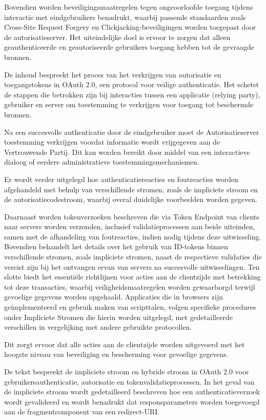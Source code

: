 Bovendien worden beveiligingsmaatregelen tegen ongeoorloofde toegang tijdens interactie met eindgebruikers benadrukt, waarbij passende standaarden zoals Cross-Site Request Forgery en Clickjacking-beveiligingen worden toegepast door de autorisatieserver.
Het uiteindelijke doel is ervoor te zorgen dat alleen geauthenticeerde en geautoriseerde gebruikers toegang hebben tot de gevraagde bronnen.

De inhoud bespreekt het proces van het verkrijgen van autorisatie en toegangstokens in OAuth 2.0, een protocol voor veilige authenticatie. Het schetst de stappen die betrokken zijn bij interacties tussen een applicatie (relying party), gebruiker en server om toestemming te verkrijgen voor toegang tot beschermde bronnen.

Na een succesvolle authenticatie door de eindgebruiker moet de Autorisatieserver toestemming verkrijgen voordat informatie wordt vrijgegeven aan de Vertrouwende Partij. Dit kan worden bereikt door middel van een interactieve dialoog of eerdere administratieve toestemmingsmechanismen.

Er wordt verder uitgelegd hoe authenticatiereacties en foutreacties worden afgehandeld met behulp van verschillende stromen, zoals de impliciete stroom en de autorisatiecodestroom, waarbij overal duidelijke voorbeelden worden gegeven.

Daarnaast worden tokenverzoeken beschreven die via Token Endpoint van clients naar servers worden verzonden, inclusief validatieprocessen aan beide uiteinden, samen met de afhandeling van foutreacties, indien nodig tijdens deze uitwisseling.
Bovendien behandelt het details over het gebruik van ID-tokens binnen verschillende stromen, zoals impliciete stromen, naast de respectieve validaties die vereist zijn bij het ontvangen ervan van servers na succesvolle uitwisselingen.
Ten slotte biedt het essentiële richtlijnen voor acties aan de clientzijde met betrekking tot deze transacties, waarbij veiligheidsmaatregelen worden gewaarborgd terwijl gevoelige gegevens worden opgehaald. Applicaties die in browsers zijn geïmplementeerd en gebruik maken van scripttalen, volgen specifieke procedures onder Impliciete Stromen die hierin worden uitgelegd, met gedetailleerde verschillen in vergelijking met andere gebruikte protocollen.

Dit zorgt ervoor dat alle acties aan de clientzijde worden uitgevoerd met het hoogste niveau van beveiliging en bescherming voor gevoelige gegevens.

De tekst bespreekt de impliciete stroom en hybride stroom in OAuth 2.0 voor gebruikersauthenticatie, autorisatie en tokenvalidatieprocessen. In het geval van de impliciete stroom wordt gedetailleerd beschreven hoe een authenticatieverzoek wordt gevalideerd en wordt benadrukt dat responsparameters worden toegevoegd aan de fragmentcomponent van een redirect-URI.

